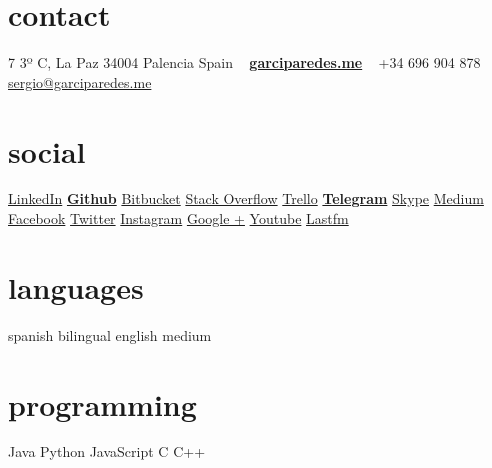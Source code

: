 \documentclass[]{friggeri-cv} %
\begin{document}


\begin{aside} %

    \section{contact}
        7 3º C, La Paz
        34004 Palencia
        Spain
        ~
        \href{http://garciparedes.me}{\textbf{garciparedes.me}}
        ~
        +34 696 904 878
        \href{mailto:sergio@garciparedes.me}{sergio@garciparedes.me}
    \section{social}
        \href{https://es.linkedin.com/in/garciparedes/en}{LinkedIn\quad\faLinkedin }
        \href{https://github.com/garciparedes}{\textbf{Github}\quad\faGithub }
        \href{https://bitbucket.org/garciparedes/}{Bitbucket\quad\faBitbucket }
        \href{http://stackoverflow.com/users/3921457/garciparedes}{Stack Overflow\quad\faStackOverflow }
        \href{https://trello.com/garciparedes}{Trello\quad\faTrello }
        \href{https://telegram.me/garciparedes}{\textbf{Telegram}\quad\faPaperPlane }
        \href{skype:garciparedes?call}{Skype\quad\faSkype }
        \href{https://medium.com/@garciparedes}{Medium\quad\faMedium }
        \href{https://facebook.com/garciparedes}{Facebook\quad\faFacebook}
        \href{https://twitter.com/garciparedes}{Twitter\quad\faTwitter }
        \href{https://www.instagram.com/garciparedes/}{Instagram\quad\faInstagram }
        \href{https://plus.google.com/+SergioGarcia-garciparedes/}{Google +\quad\faGooglePlus }
        \href{https://www.youtube.com/user/GaRcYpArEdEs/}{Youtube\quad\faYoutubePlay }
        \href{http://www.last.fm/user/garciparedes/}{Lastfm\quad\faLastfm}
    \section{languages}
        spanish bilingual
        english medium
    \section{programming}
        Java\quad{\color{red} $\varheartsuit\varheartsuit\varheartsuit\varheartsuit\varheartsuit$}{\color{black} $\varheartsuit$}
        Python\quad{\color{red} $\varheartsuit\varheartsuit\varheartsuit$}{\color{black} $\varheartsuit\varheartsuit\varheartsuit$}
        JavaScript\quad{\color{red} $\varheartsuit\varheartsuit\varheartsuit\varheartsuit$}{\color{black} $\varheartsuit\varheartsuit$}
         C\quad{\color{red} $\varheartsuit\varheartsuit\varheartsuit\varheartsuit$}{\color{black} $\varheartsuit\varheartsuit$}
         C++\quad{\color{red} $\varheartsuit\varheartsuit\varheartsuit\varheartsuit$}{\color{black} $\varheartsuit\varheartsuit$}

\end{aside}
\end{document}
